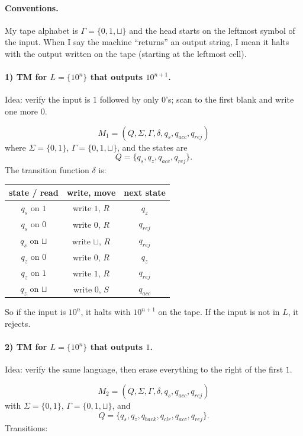 \documentclass{article}
\newcommand{\blank}{\sqcup}
\theoremstyle{theorem}
\theoremstyle{definition}
\theoremstyle{remark}
\begin{document}
\paragraph{Conventions.}
My tape alphabet is $\Gamma = \{0,1,\blank\}$ and the head starts on the leftmost symbol of the input. When I say the machine ``returns'' an output string, I mean it halts with the output written on the tape (starting at the leftmost cell).

\paragraph{1) TM for $L=\{10^n\}$ that outputs $10^{n+1}$.}
Idea: verify the input is $1$ followed by only $0$'s; scan to the first blank and write one more $0$.

\[
M_1 = (Q,\Sigma,\Gamma,\delta,q_s,q_{acc},q_{rej})
\]
where $\Sigma=\{0,1\}$, $\Gamma=\{0,1,\blank\}$, and the states are
\[
Q=\{q_s,q_{z},q_{acc},q_{rej}\}.
\]
The transition function $\delta$ is:

\begin{center}
\begin{tabular}{|c|c|c|}
  \hline
  state / read & write, move & next state \\
  \hline
  $q_s$ on $1$ & write $1$, $R$ & $q_z$ \\
  $q_s$ on $0$ & write $0$, $R$ & $q_{rej}$ \\
  $q_s$ on $\blank$ & write $\blank$, $R$ & $q_{rej}$ \\
  \hline
  $q_z$ on $0$ & write $0$, $R$ & $q_z$ \\
  $q_z$ on $1$ & write $1$, $R$ & $q_{rej}$ \\
  $q_z$ on $\blank$ & write $0$, $S$ & $q_{acc}$ \\
  \hline
\end{tabular}
\end{center}

So if the input is $10^n$, it halts with $10^{n+1}$ on the tape. If the input is not in $L$, it rejects.

\paragraph{2) TM for $L=\{10^n\}$ that outputs $1$.}
Idea: verify the same language, then erase everything to the right of the first $1$.

\[
M_2 = (Q,\Sigma,\Gamma,\delta,q_s,q_{acc},q_{rej})
\]
with $\Sigma=\{0,1\}$, $\Gamma=\{0,1,\blank\}$, and
\[
Q=\{q_s,q_{z},q_{back},q_{clr},q_{acc},q_{rej}\}.
\]
Transitions:
\end{document}
